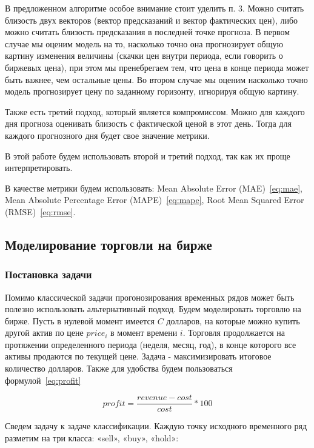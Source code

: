 \documentclass[a4paper,article,14pt]{extarticle}
\begin{document}
\par
В предложенном алгоритме особое внимание стоит уделить п. 3.
Можно считать близость двух векторов (вектор предсказаний и вектор фактических цен), либо можно считать близость предсказания в последней точке прогноза.
В первом случае мы оценим модель на то, насколько точно она прогнозирует общую картину изменения величины (скачки цен внутри периода, если говорить о биржевых цена), при этом мы пренебрегаем тем, что цена в конце периода может быть важнее, чем остальные цены.
Во втором случае мы оценим насколько точно модель прогнозирует цену по заданному горизонту, игнорируя общую картину.
\par %
Также есть третий подход, который является компромиссом.
Можно для каждого дня прогноза оценивать близость с фактической ценой в этот день.
Тогда для каждого прогнозного дня будет свое значение метрики.

В этой работе будем использовать второй и третий подход, так как их проще интерпретировать.

В качестве метрики будем использовать: Mean Absolute Error (MAE)~\eqref{eq:mae}, Mean Absolute Percentage Error (MAPE)~\eqref{eq:mape}, Root Mean Squared Error (RMSE)~\eqref{eq:rmse}.

\subsection{Моделирование торговли на бирже}
\subsubsection{Постановка задачи}

Помимо классической задачи прогонозирования временных рядов может быть полезно использовать альтернативный подход.
Будем моделировать торговлю на бирже.
Пусть в нулевой момент имеется $C$ долларов, на которые можно купить другой актив по цене $price_i$ в момент времени $i$.
Торговля продолжается на протяжении определенного периода (неделя, месяц, год), в конце которого все активы продаются по текущей цене.
Задача - максимизировать итоговое количество долларов.
Также для удобства будем пользоваться формулой~\eqref{eq:profit}

\begin{equation}
    profit = \frac{revenue - cost}{cost} * 100
    \label{eq:profit}
\end{equation}

Сведем задачу к задаче классификации.
Каждую точку исходного временного ряд разметим на три класса: «sell», «buy», «hold»:
\end{document}
